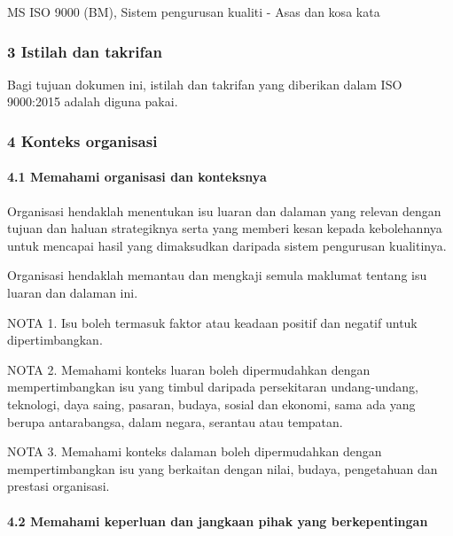 \documentclass[
]{article}
\begin{document}
MS ISO 9000 (BM), Sistem pengurusan kualiti - Asas dan kosa kata

\hypertarget{istilah-dan-takrifan}{%
\subsubsection{3 Istilah dan takrifan}\label{istilah-dan-takrifan}}

Bagi tujuan dokumen ini, istilah dan takrifan yang diberikan dalam ISO
9000:2015 adalah diguna pakai.

\hypertarget{konteks-organisasi}{%
\subsubsection{4 Konteks organisasi}\label{konteks-organisasi}}

\hypertarget{memahami-organisasi-dan-konteksnya}{%
\paragraph{4.1 Memahami organisasi dan
konteksnya}\label{memahami-organisasi-dan-konteksnya}}

Organisasi hendaklah menentukan isu luaran dan dalaman yang relevan
dengan tujuan dan haluan strategiknya serta yang memberi kesan kepada
kebolehannya untuk mencapai hasil yang dimaksudkan daripada sistem
pengurusan kualitinya.

Organisasi hendaklah memantau dan mengkaji semula maklumat tentang isu
luaran dan dalaman ini.

NOTA 1. Isu boleh termasuk faktor atau keadaan positif dan negatif untuk
dipertimbangkan.

NOTA 2. Memahami konteks luaran boleh dipermudahkan dengan
mempertimbangkan isu yang timbul daripada persekitaran undang-undang,
teknologi, daya saing, pasaran, budaya, sosial dan ekonomi, sama ada
yang berupa antarabangsa, dalam negara, serantau atau tempatan.

NOTA 3. Memahami konteks dalaman boleh dipermudahkan dengan
mempertimbangkan isu yang berkaitan dengan nilai, budaya, pengetahuan
dan prestasi organisasi.

\hypertarget{memahami-keperluan-dan-jangkaan-pihak-yang-berkepentingan}{%
\paragraph{4.2 Memahami keperluan dan jangkaan pihak yang
berkepentingan}\label{memahami-keperluan-dan-jangkaan-pihak-yang-berkepentingan}}
\end{document}

